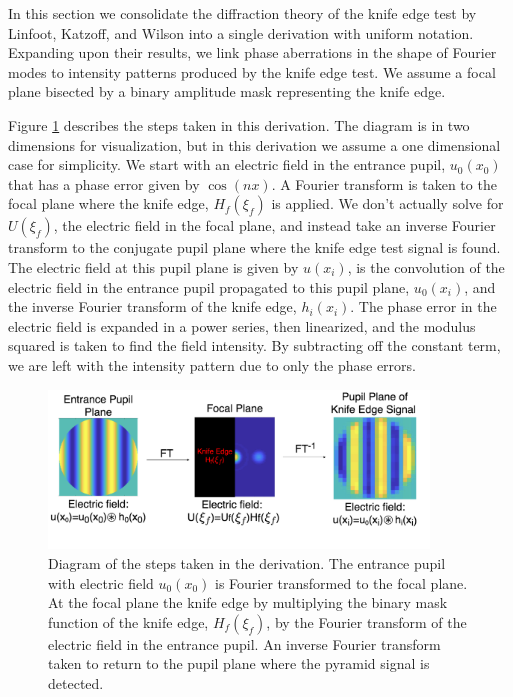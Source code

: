  In this section we consolidate the diffraction theory of the knife edge test by Linfoot\cite{linfoot1948theory}, Katzoff\cite{katzoff1971quantitative}, and Wilson\cite{wilson1975wavefront} into a single derivation with uniform notation. Expanding upon their results, we link phase aberrations in the shape of Fourier modes to intensity patterns produced by the knife edge test. We assume a focal plane bisected by a binary amplitude mask representing the knife edge. 
 
 Figure \ref{fig:derivationFlow} describes the steps taken in this derivation. The diagram is in two dimensions for visualization, but in this derivation we assume a one dimensional case for simplicity. We start with an electric field in the entrance pupil, $u_0(x_0)$ that has a phase error given by $\cos(nx)$. A Fourier transform is taken to the focal plane where the knife edge, $H_f(\xi_f)$ is applied. We don't actually solve for $U(\xi_f)$, the electric field in the focal plane, and instead take an inverse Fourier transform to the conjugate pupil plane where the knife edge test signal is found. The electric field at this pupil plane is given by $u(x_i)$, is the convolution of the electric field in the entrance pupil propagated to this pupil plane, $u_0(x_i)$, and the inverse Fourier transform of the knife edge, $h_i(x_i)$. The phase error in the electric field is expanded in a power series, then linearized, and the modulus squared is taken to find the field intensity. By subtracting off the constant term, we are left with the intensity pattern due to only the phase errors. 
 
 
 
 \begin{figure}
     \centering
     \includegraphics[width=0.9\textwidth]{Chapter Materials/Chapter Two Materials/DerivationFlow.png}
     \caption{Diagram of the steps taken in the derivation. The entrance pupil with electric field $u_0(x_0)$ is Fourier transformed to the focal plane. At the focal plane the knife edge by multiplying the binary mask function of the knife edge, $H_f(\xi_f)$, by the Fourier transform of the electric field in the entrance pupil. An inverse Fourier transform taken to return to the pupil plane where the pyramid signal is detected.}
     \label{fig:derivationFlow}
 \end{figure}
 
